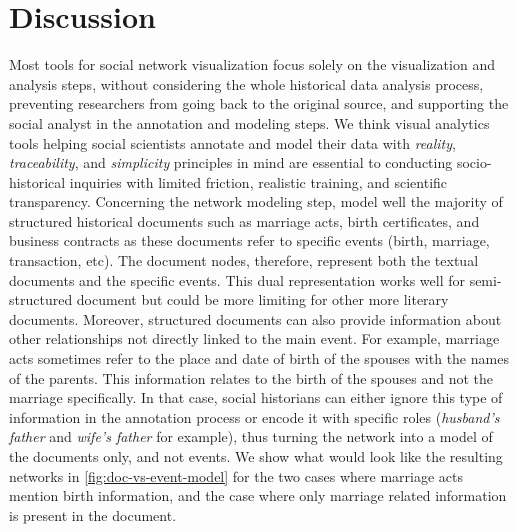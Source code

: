\section{Discussion}


Most tools for social network visualization focus solely on the visualization and analysis steps, without considering the whole historical data analysis process, preventing researchers from going back to the original source, and supporting the social analyst in the annotation and modeling steps.
We think visual analytics tools helping social scientists annotate and model their data with \textit{reality}, \textit{traceability}, and \textit{simplicity} principles in mind are essential to conducting socio-historical inquiries with limited friction, realistic training, and scientific transparency.
Concerning the network modeling step, \modelplural model well the majority of structured historical documents such as marriage acts, birth certificates, and business contracts as these documents refer to specific events (birth, marriage, transaction, etc).
The document nodes, therefore, represent both the textual documents and the specific events.
This dual representation works well for semi-structured document but could be more limiting for other more literary documents.
Moreover, structured documents can also provide information about other relationships not directly linked to the main event.
For example, marriage acts sometimes refer to the place and date of birth of the spouses with the names of the parents.
This information relates to the birth of the spouses and not the marriage specifically.
In that case, social historians can either ignore this type of information in the annotation process or encode it with specific roles (\textit{husband's father} and \textit{wife's father} for example), thus turning the network into a model of the documents only, and not events.
We show what would look like the resulting networks in \autoref{fig:doc-vs-event-model} for the two cases where marriage acts mention birth information, and the case where only marriage related information is present in the document.

